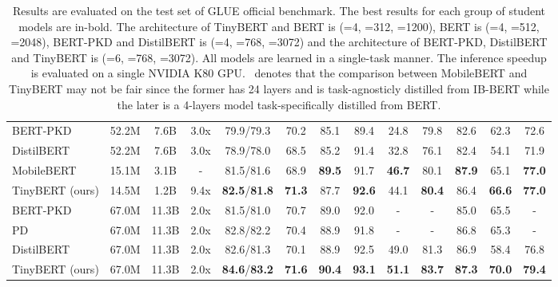 \documentclass[11pt,a4paper]{article}
\begin{document}
\begin{table*}[tbp]
\begin{center}
{\begin{tabular}{@{}l|ccc|cccccccc|c@{}}
	BERT-PKD                    &       52.2M       &       7.6B       &       3.0x       &          79.9/79.3          &     70.2      &     85.1      &      89.4      &     24.8      &      79.8      &     82.6      &     62.3      &     72.6      \\
	DistilBERT                  &       52.2M       &       7.6B       &       3.0x       &          78.9/78.0          &     68.5      &     85.2      &      91.4      &     32.8      &      76.1      &     82.4      &     54.1      &     71.9      \\
	MobileBERT   &       15.1M       &       3.1B       &        -         &          81.5/81.6          &     68.9      & \textbf{89.5} &      91.7      & \textbf{46.7} &      80.1      & \textbf{87.9} &     65.1      & \textbf{77.0} \\
	TinyBERT (ours)             &       14.5M       &       1.2B       &       9.4x       & \textbf{82.5}/\textbf{81.8} & \textbf{71.3} &     87.7      & \textbf{92.6}  &     44.1      & \textbf{80.4}  &     86.4      & \textbf{66.6} & \textbf{77.0} \\ \hline
	BERT-PKD                    &       67.0M       &      11.3B       &       2.0x       &          81.5/81.0          &     70.7      &     89.0      &      92.0      &       -       &       -        &     85.0      &     65.5      &       -       \\
	PD                    &       67.0M       &      11.3B       &       2.0x       &          82.8/82.2          &     70.4      &     88.9      &       91.8      &       -       &       -        &     86.8      &     65.3      &       -       \\

	DistilBERT                  &       67.0M       &      11.3B       &       2.0x       &          82.6/81.3          &     70.1      &     88.9      &      92.5      &     49.0      &      81.3      &     86.9      &     58.4      &     76.8      \\
	TinyBERT (ours)             &       67.0M       &      11.3B       &       2.0x       & \textbf{84.6}/\textbf{83.2} & \textbf{71.6} & \textbf{90.4} & \textbf{93.1}  & \textbf{51.1} & \textbf{83.7}  & \textbf{87.3} & \textbf{70.0} & \textbf{79.4}
\end{tabular}
}
\caption{Results are evaluated on the test set of GLUE official benchmark. The best results for each group of student models are in-bold. The architecture of TinyBERT and BERT is (=4, =312, =1200), BERT is (=4, =512, =2048), BERT-PKD and DistilBERT is (=4, =768, =3072) and the architecture of BERT-PKD, DistilBERT and TinyBERT is (=6, =768, =3072). All models are learned in a single-task manner. The inference speedup is evaluated on a single NVIDIA K80 GPU.  ~denotes that the comparison between MobileBERT and TinyBERT may not be fair since the former has 24 layers and is task-agnosticly distilled from IB-BERT while the later is a 4-layers model task-specifically distilled from BERT.} 
\label{tab:glue_main}
\vspace{-0.1in}
\end{center}
\end{table*}
\end{document}
